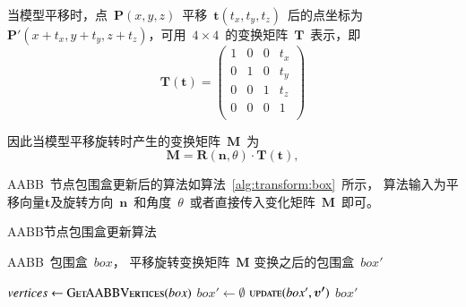 当模型平移时，点~$\bm{P}(x, y, z)$~平移~$\bm{t}(t_x, t_y, t_z)$~后的点坐标为~$\bm{P}'(x+t_x, y+t_y, z+t_z)$，可用~$4 \times 4$~的变换矩阵~$\bm{T}$~表示，即
\begin{equation}
  \bm{T}(\bm{t}) =
  \begin{pmatrix}
    1 & 0 & 0 & t_x \\
    0 & 1 & 0 & t_y \\
    0 & 0 & 1 & t_z \\
    0 & 0 & 0 & 1 \\
  \end{pmatrix}
  \label{equa:translate:matrix}
\end{equation}

因此当模型平移旋转时产生的变换矩阵~$\bm{M}$~为
\begin{equation}
\bm{M}=\bm{R}(\bm{n}, \theta) \cdot \bm{T}(\bm{t}),
\label{equa:transform:matrix}
\end{equation}

AABB~节点包围盒更新后的算法如算法~\ref{alg:transform:box}~所示，
算法输入为平移向量$\bm{t}$及旋转方向~$\bm{n}$~和角度~$\theta$~或者直接传入变化矩阵~$\bm{M}$~即可。

\begin{algorithm}[htbp]
\small
\caption{AABB节点包围盒更新算法}
\label{alg:transform:box}
\begin{algorithmic}[1]
\Require
AABB~包围盒~$box$，
平移旋转变换矩阵~$\bm{M}$
\Ensure
变换之后的包围盒~$box'$

    \State $vertices \gets \Call{GetAABBVertices}{box}$ 
    \State $box' \gets \emptyset$
     
         
        \State $\Call{update}{box', \bm{v'}}$ 
    \EndFor
    \State \Return $box'$
\EndFunction
\end{algorithmic}
\end{algorithm}


